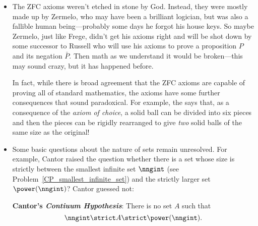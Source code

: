 %
\begin{itemize}

\item The ZFC axioms weren't etched in stone by God.  Instead,
  they were mostly made up by Zermelo, who may have been a brilliant
  logician, but was also a fallible human being---probably some days
  he forgot his house keys.  So maybe Zermelo, just like Frege, didn't
  get his axioms right and will be shot down by some successor to
  Russell%
who will use his axioms to prove a proposition $P$ and
  its negation $\bar{P}$.  Then math as we understand it would be
  broken---this may sound crazy, but it has happened before.

  In fact, while there is broad agreement that the ZFC axioms are
  capable of proving all of standard mathematics, the axioms have some
  further consequences that sound paradoxical.  For example, the
   says that, as a consequence of the
  \emph{axiom of choice}, a solid
  ball can be divided into six pieces and then the pieces can be
  rigidly rearranged to give \emph{two} solid balls of the same size
  as the original!

\item Some basic questions about the nature of sets remain unresolved.
  For example, Cantor raised the question whether there is a set whose
  size is strictly between the smallest infinite set $\nngint$ (see
  Problem~\ref{CP_smallest_infinite_set}) and the strictly larger
  set $\power(\nngint)$?  Cantor guessed not:

  \textbf{Cantor's \emph{Contiuum
      Hypothesis}}: There is no set $A$ such that
  \[
  \nngint \strict A \strict \power(\nngint).
  \]


\end{itemize}
